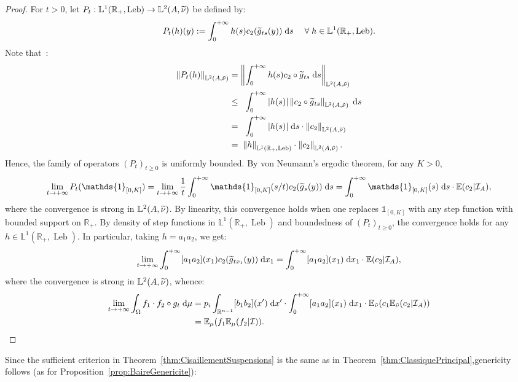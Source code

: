 \documentclass[AHL,Unicode,longabstracts]{cedram}
\DeclareMathOperator{\Leb}{Leb}
\newcommand{\R}{\mathbb{R}}
\newcommand{\Ebb}{\mathbb{E}}
\newcommand{\Lbb}{\mathbb{L}}
\newcommand{\Ical}{\mathcal{I}}
\newcommand{\dd}{\;{\rm d}}
\newcommand{\norm}[2]{\left\| #1 \right\|_{#2}}
\newcommand*{\un}{\mathds{1}}
\let\oldtilde\tilde
\renewcommand*{\tilde}[1]{\mathchoice{\widetilde{#1}}{\widetilde{#1}}{\oldtilde{#1}}{\oldtilde{#1}}}\let\oldhat\hat
\renewcommand*{\hat}[1]{\mathchoice{\widehat{#1}}{\widehat{#1}}{\oldhat{#1}}{\oldhat{#1}}}\let\oldforall\forall
\renewcommand*{\forall}{\mathrel{\oldforall}}
\begin{document}
\begin{proof}
For $t>0$, let $P_t: \Lbb^1 (\R_+, \Leb) \to \Lbb^2 (A, \tilde{\nu})$ be defined by:
\[
P_t (h) (y) := \int_0^{+\infty} h (s) c_2 (\tilde{g}_{ts} (y)) \dd s \quad \forall h \in \Lbb^1 (\R_+, \Leb).
\]
Note that~:
\begin{align*}
\norm{P_t (h)}{\Lbb^2 (A, \tilde{\nu})} & = \norm{\int_0^{+\infty} h (s) c_2 \circ \tilde{g}_{ts} \dd s}{\Lbb^2 (A, \tilde{\nu})} \\
& \leq \;\;\int_0^{+\infty} |h (s)| \norm{c_2 \circ \tilde{g}_{ts}}{\Lbb^2 (A, \tilde{\nu})} \dd s \\
& = \;\;\int_0^{+\infty} |h (s)| \dd s \cdot \norm{c_2}{\Lbb^2 (A, \tilde{\nu})} \\
& = \;\norm{h}{\Lbb^1 (\R_+, \Leb)} \cdot \norm{c_2}{\Lbb^2 (A, \tilde{\nu})}.
\end{align*}
Hence, the family of operators $(P_t)_{t\geq 0}$ is uniformly bounded. By von Neumann's ergodic theorem, for any $K>0$,
\[
\lim_{t \to + \infty} P_t (\un_{[0,K]}) = \lim_{t \to + \infty} \frac{1}{t} \int_0^{+\infty} \un_{[0,K]} (s/t) c_2 (\tilde{g}_s (y)) \dd s = \int_0^{+\infty} \un_{[0,K]} (s) \dd s \cdot \Ebb (c_2 | \Ical_A),
\]
where the convergence is strong in $\Lbb^2 (A, \tilde{\nu})$. By linearity, this convergence holds when one replaces $\un_{[0,K]}$ with any step function with bounded support on $\R_+$. By density of step functions in $\Lbb^1 (\R_+, \Leb)$ and boundedness of $(P_t)_{t \geq 0}$, the convergence holds for any $h \in \Lbb^1 (\R_+, \Leb)$. In particular, taking $h = a_1 a_2$, we get:
\[
\lim_{t \to + \infty} \int_0^{+\infty} [a_1 a_2] (x_1) c_2 (\tilde{g}_{t x_1} (y)) \dd x_1 = \int_0^{+\infty} [a_1 a_2] (x_1) \dd x_1 \cdot \Ebb (c_2 | \Ical_A),
\]
where the convergence is strong in $\Lbb^2 (A, \tilde{\nu})$, whence:
\begin{align*}
\lim_{t \to + \infty} \int_\Omega f_1 \cdot f_2 \circ g_t \dd \mu & = p_i \int_{\R^{n-1}} [b_1 b_2] (x') \dd x' \cdot \int_0^{+\infty} [a_1 a_2] (x_1) \dd x_1 \cdot \Ebb_{\tilde{\nu}} (c_1 \Ebb_{\tilde{\nu}} (c_2 | \Ical_A)) \\
& = \Ebb_\mu (f_1 \Ebb_\mu (f_2 | \Ical)).\qedhere
\end{align*}
\end{proof}


Since the sufficient criterion in Theorem~\ref{thm:CisaillementSuspensions} is the same as in Theorem~\ref{thm:ClassiquePrincipal},\linebreak genericity follows (as for Proposition~\ref{prop:BaireGenericite}):
\end{document}
